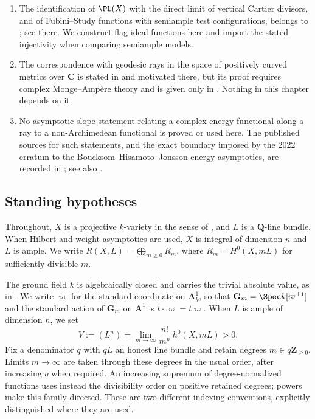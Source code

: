 \begin{enumerate}
\item The identification of $\PL(X)$ with the direct limit of vertical
 Cartier divisors, and of Fubini--Study functions with semiample test
 configurations, belongs to ; see
  there.  We construct flag-ideal functions
 here and import the stated injectivity when comparing semiample models.
\item The correspondence with geodesic rays in the space of positively
 curved metrics over $\mathbf C$ is stated in
  and motivated there, but its proof
 requires complex Monge--Amp\`ere theory and is given only in
 .  Nothing in this chapter depends on it.
\item No asymptotic-slope statement relating a complex energy functional
 along a ray to a non-Archimedean functional is proved or used here.  The
 published sources for such statements, and the exact boundary imposed by
 the 2022 erratum to the Boucksom--Hisamoto--Jonsson energy asymptotics,
 are recorded in ; see also
 .
\end{enumerate}

\subsection{Standing hypotheses}
\label{sec:ch33-hypotheses}

Throughout, $X$ is a projective $k$-variety in the sense of
\cite[\S1]{BJ22}, and $L$ is a
$\mathbf Q$-line bundle.  When Hilbert and weight asymptotics are used,
$X$ is integral of dimension $n$ and $L$ is ample.  We write
$R(X,L)=\bigoplus_{m\geq0}R_m$, where
$R_m=H^0(X,mL)$ for sufficiently divisible $m$.

The ground field $k$ is algebraically closed and carries the trivial
absolute value, as in .  We write
$\varpi$ for the standard coordinate on $\mathbf A^1_k$, so that
$\mathbf G_m=\Spec k[\varpi^{\pm1}]$ and the standard action of
$\mathbf G_m$ on $\mathbf A^1$ is
$t\cdot\varpi=t\varpi$.  When $L$ is ample of dimension $n$, we set
\begin{equation}
\label{eq:ch33-volume}
 V:=(L^n)=\lim_{m\to\infty}\frac{n!}{m^n}\,h^0(X,mL)>0 .
\end{equation}
Fix a denominator $q$ with $qL$ an honest line bundle and retain degrees
$m\in q\mathbf Z_{\geq0}$.  Limits $m\to\infty$ are taken through these
degrees in the usual order, after increasing $q$ when required.
An increasing supremum of degree-normalized functions uses instead the
divisibility order on positive retained degrees; powers make this family
directed.  These are two different indexing conventions, explicitly
distinguished where they are used.

